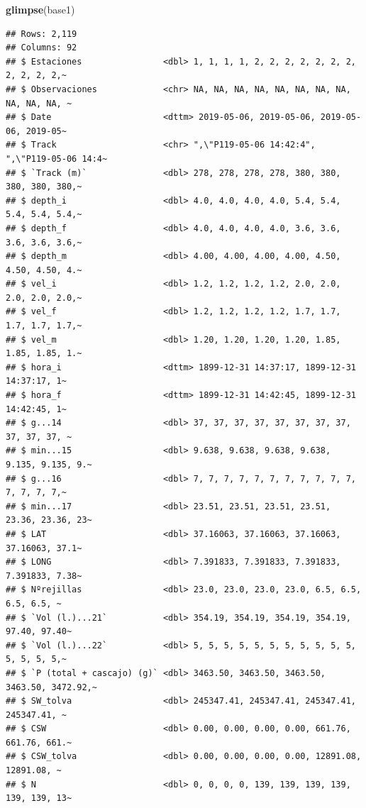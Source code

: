 \documentclass[
]{article}
\newenvironment{Shaded}{\begin{snugshade}}{\end{snugshade}}
\newcommand{\FunctionTok}[1]{\textcolor[rgb]{0.13,0.29,0.53}{\textbf{#1}}}
\newcommand{\NormalTok}[1]{#1}
\begin{document}
\begin{Shaded}
\begin{Highlighting}[]
\FunctionTok{glimpse}\NormalTok{(base1)}
\end{Highlighting}
\end{Shaded}

\begin{verbatim}
## Rows: 2,119
## Columns: 92
## $ Estaciones                <dbl> 1, 1, 1, 1, 2, 2, 2, 2, 2, 2, 2, 2, 2, 2, 2,~
## $ Observaciones             <chr> NA, NA, NA, NA, NA, NA, NA, NA, NA, NA, NA, ~
## $ Date                      <dttm> 2019-05-06, 2019-05-06, 2019-05-06, 2019-05~
## $ Track                     <chr> ",\"P119-05-06 14:42:4", ",\"P119-05-06 14:4~
## $ `Track (m)`               <dbl> 278, 278, 278, 278, 380, 380, 380, 380, 380,~
## $ depth_i                   <dbl> 4.0, 4.0, 4.0, 4.0, 5.4, 5.4, 5.4, 5.4, 5.4,~
## $ depth_f                   <dbl> 4.0, 4.0, 4.0, 4.0, 3.6, 3.6, 3.6, 3.6, 3.6,~
## $ depth_m                   <dbl> 4.00, 4.00, 4.00, 4.00, 4.50, 4.50, 4.50, 4.~
## $ vel_i                     <dbl> 1.2, 1.2, 1.2, 1.2, 2.0, 2.0, 2.0, 2.0, 2.0,~
## $ vel_f                     <dbl> 1.2, 1.2, 1.2, 1.2, 1.7, 1.7, 1.7, 1.7, 1.7,~
## $ vel_m                     <dbl> 1.20, 1.20, 1.20, 1.20, 1.85, 1.85, 1.85, 1.~
## $ hora_i                    <dttm> 1899-12-31 14:37:17, 1899-12-31 14:37:17, 1~
## $ hora_f                    <dttm> 1899-12-31 14:42:45, 1899-12-31 14:42:45, 1~
## $ g...14                    <dbl> 37, 37, 37, 37, 37, 37, 37, 37, 37, 37, 37, ~
## $ min...15                  <dbl> 9.638, 9.638, 9.638, 9.638, 9.135, 9.135, 9.~
## $ g...16                    <dbl> 7, 7, 7, 7, 7, 7, 7, 7, 7, 7, 7, 7, 7, 7, 7,~
## $ min...17                  <dbl> 23.51, 23.51, 23.51, 23.51, 23.36, 23.36, 23~
## $ LAT                       <dbl> 37.16063, 37.16063, 37.16063, 37.16063, 37.1~
## $ LONG                      <dbl> 7.391833, 7.391833, 7.391833, 7.391833, 7.38~
## $ Nºrejillas                <dbl> 23.0, 23.0, 23.0, 23.0, 6.5, 6.5, 6.5, 6.5, ~
## $ `Vol (l.)...21`           <dbl> 354.19, 354.19, 354.19, 354.19, 97.40, 97.40~
## $ `Vol (l.)...22`           <dbl> 5, 5, 5, 5, 5, 5, 5, 5, 5, 5, 5, 5, 5, 5, 5,~
## $ `P (total + cascajo) (g)` <dbl> 3463.50, 3463.50, 3463.50, 3463.50, 3472.92,~
## $ SW_tolva                  <dbl> 245347.41, 245347.41, 245347.41, 245347.41, ~
## $ CSW                       <dbl> 0.00, 0.00, 0.00, 0.00, 661.76, 661.76, 661.~
## $ CSW_tolva                 <dbl> 0.00, 0.00, 0.00, 0.00, 12891.08, 12891.08, ~
## $ N                         <dbl> 0, 0, 0, 0, 139, 139, 139, 139, 139, 139, 13~

\end{verbatim}
\end{document}
